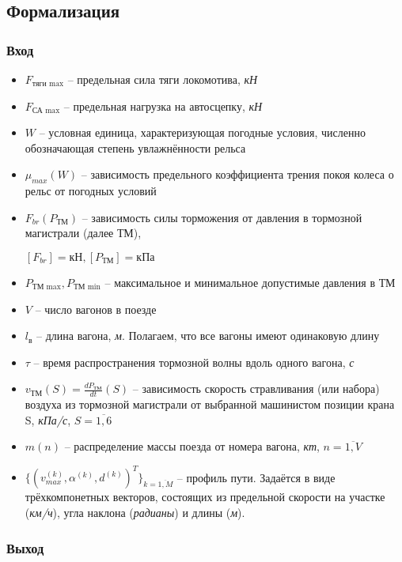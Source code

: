 \begin{itemize}
\subsection{Формализация}
\subsubsection{Вход}
\begin{itemize}
\item $F_{\text{тяги max}}$ -- предельная сила тяги локомотива, \textit{кН}
\item $F_{\text{СА max}}$ -- предельная нагрузка на автосцепку, \textit{кН}
\item $W$ -- условная единица, характеризующая погодные условия, численно обозначающая степень увлажнённости рельса
\item $\mu_{max}(W)$ -- зависимость предельного коэффициента трения покоя колеса о рельс от погодных условий
\item $F_{br}(P_{\text{ТМ}})$ -- зависимость силы торможения от давления в тормозной магистрали (далее ТМ),

$[F_{br}]=\text{кН}, [P_{\text{ТМ}}]=\text{кПа}$
\item $P_{\text{ТМ max}}, P_{\text{ТМ min}}$ -- максимальное и минимальное допустимые давления в ТМ
\item $V$ -- число вагонов в поезде
\item $l_{\text{в}}$ -- длина вагона, \textit{м}. Полагаем, что все вагоны имеют одинаковую длину
\item $\tau$ -- время распространения тормозной волны вдоль одного вагона,  \textit{с}
\item $v_{\text{ТМ}}(S)=\frac{dP_{ТМ}}{dt}(S)$ -- зависимость скорость стравливания (или набора) воздуха из тормозной магистрали от выбранной машинистом позиции крана S, \textit{кПа/с}, $S=\overline{1,6}$
\item $m(n)$ -- распределение массы поезда от номера вагона, \textit{кт}, $n=\overline{1, V}$
\item
$\{(v_{max}^{(k)}, \alpha^{(k)}, d^{(k)})^{T}\}_{k=\overline{1, M}}$ -- профиль пути. Задаётся в виде трёхкомпонетных векторов, состоящих из предельной скорости на участке (\textit{км/ч}), угла наклона (\textit{радианы}) и длины (\textit{м}).

\end{itemize}

\subsubsection{Выход}


\end{itemize}
